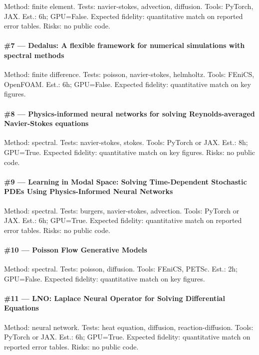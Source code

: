 \documentclass[10pt,letterpaper]{article}
\begin{document}
Method: finite element. Tests: navier-stokes, advection, diffusion. Tools: PyTorch, JAX. Est.: 6h; GPU=False. Expected fidelity: quantitative match on reported error tables. Risks: no public code.

\paragraph{\#7 — Dedalus: A flexible framework for numerical simulations with spectral methods}

Method: finite difference. Tests: poisson, navier-stokes, helmholtz. Tools: FEniCS, OpenFOAM. Est.: 6h; GPU=False. Expected fidelity: quantitative match on key figures. 

\paragraph{\#8 — Physics-informed neural networks for solving Reynolds-averaged Navier-Stokes equations}

Method: spectral. Tests: navier-stokes, stokes. Tools: PyTorch or JAX. Est.: 8h; GPU=True. Expected fidelity: quantitative match on key figures. Risks: no public code.

\paragraph{\#9 — Learning in Modal Space: Solving Time-Dependent Stochastic PDEs Using Physics-Informed Neural Networks}

Method: spectral. Tests: burgers, navier-stokes, advection. Tools: PyTorch or JAX. Est.: 6h; GPU=True. Expected fidelity: quantitative match on reported error tables. Risks: no public code.

\paragraph{\#10 — Poisson Flow Generative Models}

Method: spectral. Tests: poisson, diffusion. Tools: FEniCS, PETSc. Est.: 2h; GPU=False. Expected fidelity: quantitative match on key figures. 

\paragraph{\#11 — LNO: Laplace Neural Operator for Solving Differential Equations}

Method: neural network. Tests: heat equation, diffusion, reaction-diffusion. Tools: PyTorch or JAX. Est.: 6h; GPU=True. Expected fidelity: quantitative match on reported error tables. Risks: no public code.
\end{document}
